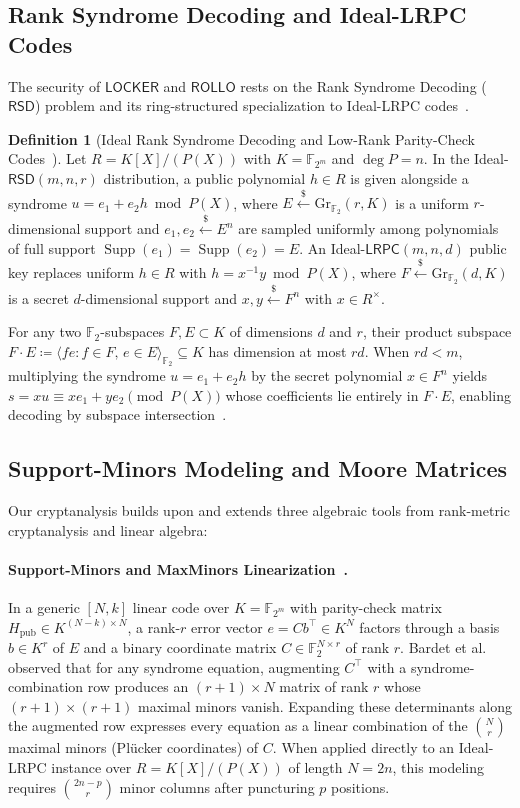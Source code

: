 \documentclass[11pt,a4paper]{article}
\theoremstyle{definition}
\newtheorem{definition}[theorem]{Definition}
\theoremstyle{remark}
\newcommand{\F}{\mathbb{F}}
\newcommand{\Ftwo}{\mathbb{F}_2}
\newcommand{\Gr}{\mathrm{Gr}}
\newcommand{\Supp}{\operatorname{Supp}}
\begin{document}
\subsection{Rank Syndrome Decoding and Ideal-LRPC Codes}
The security of $\mathsf{LOCKER}$ and $\mathsf{ROLLO}$ rests on the Rank Syndrome Decoding ($\mathsf{RSD}$) problem and its ring-structured specialization to Ideal-LRPC codes~\cite{GMRZ13,LOCKER17,ROLLO20}.

\begin{definition}[Ideal Rank Syndrome Decoding and Low-Rank Parity-Check Codes~\cite{GMRZ13,ROLLO20}]
\label{def:ideal-rsd}
Let $R = K[X]/(P(X))$ with $K = \F_{2^m}$ and $\deg P = n$. In the Ideal-$\mathsf{RSD}(m, n, r)$ distribution, a public polynomial $h \in R$ is given alongside a syndrome $u = e_1 + e_2 h \bmod P(X)$, where $E \xleftarrow{\$} \Gr_{\Ftwo}(r, K)$ is a uniform $r$-dimensional support and $e_1, e_2 \xleftarrow{\$} E^n$ are sampled uniformly among polynomials of full support $\Supp(e_1) = \Supp(e_2) = E$. An Ideal-$\mathsf{LRPC}(m, n, d)$ public key replaces uniform $h \in R$ with $h = x^{-1} y \bmod P(X)$, where $F \xleftarrow{\$} \Gr_{\Ftwo}(d, K)$ is a secret $d$-dimensional support and $x, y \xleftarrow{\$} F^n$ with $x \in R^\times$.
\end{definition}

For any two $\Ftwo$-subspaces $F, E \subset K$ of dimensions $d$ and $r$, their product subspace $F \cdot E \coloneqq \langle f e : f \in F,\, e \in E \rangle_{\Ftwo} \subseteq K$ has dimension at most $r d$. When $r d < m$, multiplying the syndrome $u = e_1 + e_2 h$ by the secret polynomial $x \in F^n$ yields $s = x u \equiv x e_1 + y e_2 \pmod{P(X)}$ whose coefficients lie entirely in $F \cdot E$, enabling decoding by subspace intersection~\cite{GMRZ13}.

\subsection{Support-Minors Modeling and Moore Matrices}
Our cryptanalysis builds upon and extends three algebraic tools from rank-metric cryptanalysis and linear algebra:

\paragraph{Support-Minors and MaxMinors Linearization~\cite{BBC+20,BBGT23}.}
In a generic $[N, k]$ linear code over $K = \F_{2^m}$ with parity-check matrix $H_{\text{pub}} \in K^{(N-k) \times N}$, a rank-$r$ error vector $e = C b^\top \in K^N$ factors through a basis $b \in K^r$ of $E$ and a binary coordinate matrix $C \in \Ftwo^{N \times r}$ of rank $r$. Bardet et al.~\cite{BBC+20,BBGT23} observed that for any syndrome equation, augmenting $C^\top$ with a syndrome-combination row produces an $(r+1) \times N$ matrix of rank $r$ whose $(r+1) \times (r+1)$ maximal minors vanish. Expanding these determinants along the augmented row expresses every equation as a linear combination of the $\binom{N}{r}$ maximal minors (Pl\"{u}cker coordinates) of $C$. When applied directly to an Ideal-LRPC instance over $R = K[X]/(P(X))$ of length $N = 2n$, this modeling requires $\binom{2n-p}{r}$ minor columns after puncturing $p$ positions.
\end{document}
